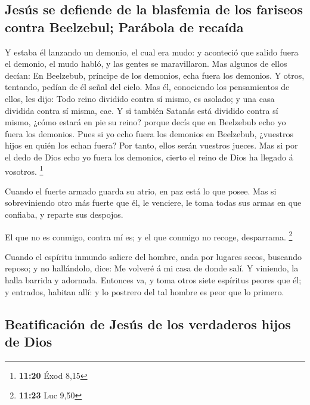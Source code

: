 \hypertarget{jesuxfas-se-defiende-de-la-blasfemia-de-los-fariseos-contra-beelzebul-paruxe1bola-de-recauxedda}{%
\subsection{Jesús se defiende de la blasfemia de los fariseos contra
Beelzebul; Parábola de
recaída}\label{jesuxfas-se-defiende-de-la-blasfemia-de-los-fariseos-contra-beelzebul-paruxe1bola-de-recauxedda}}

 Y estaba él lanzando un demonio, el cual era mudo: y
aconteció que salido fuera el demonio, el mudo habló, y las gentes se
maravillaron.  Mas algunos de ellos decían: En Beelzebub,
príncipe de los demonios, echa fuera los demonios.  Y
otros, tentando, pedían de él señal del cielo.  Mas él,
conociendo los pensamientos de ellos, les dijo: Todo reino dividido
contra sí mismo, es asolado; y una casa dividida contra sí misma, cae.
 Y si también Satanás está dividido contra sí mismo,
¿cómo estará en pie su reino? porque decís que en Beelzebub echo yo
fuera los demonios.  Pues si yo echo fuera los demonios
en Beelzebub, ¿vuestros hijos en quién los echan fuera? Por tanto, ellos
serán vuestros jueces.  Mas si por el dedo de Dios echo
yo fuera los demonios, cierto el reino de Dios ha llegado á vosotros.
\footnote{\textbf{11:20} Éxod 8,15}

 Cuando el fuerte armado guarda su atrio, en paz está lo
que posee.  Mas si sobreviniendo otro más fuerte que él,
le venciere, le toma todas sus armas en que confiaba, y reparte sus
despojos.

 El que no es conmigo, contra mí es; y el que conmigo no
recoge, desparrama. \footnote{\textbf{11:23} Luc 9,50}

 Cuando el espíritu inmundo saliere del hombre, anda por
lugares secos, buscando reposo; y no hallándolo, dice: Me volveré á mi
casa de donde salí.  Y viniendo, la halla barrida y
adornada.  Entonces va, y toma otros siete espíritus
peores que él; y entrados, habitan allí: y lo postrero del tal hombre es
peor que lo primero.

\hypertarget{beatificaciuxf3n-de-jesuxfas-de-los-verdaderos-hijos-de-dios}{%
\subsection{Beatificación de Jesús de los verdaderos hijos de
Dios}\label{beatificaciuxf3n-de-jesuxfas-de-los-verdaderos-hijos-de-dios}}

